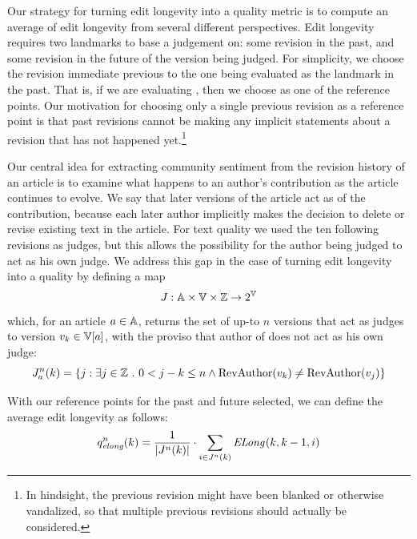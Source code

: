 Our strategy for turning edit longevity into a quality metric
is to compute an average of edit longevity from several different
perspectives.
Edit longevity requires two landmarks to base a judgement on:
some revision in the past, and some revision in the future of
the version being judged.
For simplicity, we choose the revision immediate previous to
the one being evaluated as the landmark in the past.
That is, if we are evaluating , then we choose
 as one of the reference points.
Our motivation for choosing only a single previous revision
as a reference point is that past revisions cannot be making
any implicit statements about a revision that has not happened
yet.\footnote{In hindsight, the previous revision might have been
blanked or otherwise vandalized, so that multiple previous revisions
should actually be considered.}

Our central idea for extracting community sentiment from the
revision history of an article is to examine what happens to an
author's contribution as the article continues to evolve.
We say that later versions of the article act as 
of the contribution, because each later author implicitly makes
the decision to delete or revise existing text in the article.
For text quality we used the ten following revisions as judges,
but this allows the possibility for the author being judged
to act as his own judge.
We address this gap in the case of turning edit longevity into
a quality by defining a map
\begin{equation*}
J : \articles \times \versions{} \times \mathbb{Z} \to 2^\versions{}
\end{equation*}
which, for an article $a \in \mathbb{A}$,
returns the set of up-to $n$ versions that act as judges
to version $\version{k} \in \versions{a}$, with the proviso
that author of  does not act as his own judge:
\begin{equation}
\judges{a}{n}{k} = \{ j : \exists j \in \mathbb{Z}\ .\ 0 < j - k \le n
    \wedge \revauthor{\version{k}} \ne \revauthor{\version{j}} \}
\label{def:judges}
\end{equation}

With our reference points for the past and future selected, we
can define the average edit longevity as follows:
\begin{equation*}
\quality{elong}{n}{k} = \frac{1}{|\judges{}{n}{k}|} \cdot
      \sum_{i \in \judges{}{n}{k}} \esurv{}{k,k-1,i}
\end{equation*}

